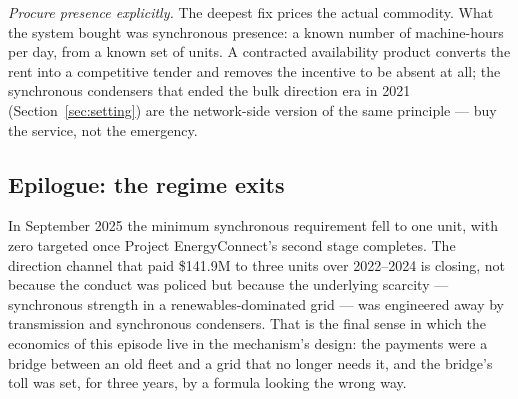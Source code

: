\emph{Procure presence explicitly.} The deepest fix prices the actual
commodity. What the system bought was synchronous presence: a known number of
machine-hours per day, from a known set of units. A contracted availability
product converts the rent into a competitive tender and removes the incentive
to be absent at all; the synchronous condensers that ended the bulk direction
era in 2021 (Section~\ref{sec:setting}) are the network-side version of the
same principle --- buy the service, not the emergency.

\subsection{Epilogue: the regime exits}

In September 2025 the minimum synchronous requirement fell to one unit, with
zero targeted once Project EnergyConnect's second stage completes. The
direction channel that paid \$141.9M to three units over 2022--2024 is
closing, not because the conduct was policed but because the underlying
scarcity --- synchronous strength in a renewables-dominated grid --- was
engineered away by transmission and synchronous condensers. That is the final
sense in which the economics of this episode live in the mechanism's design:
the payments were a bridge between an old fleet and a grid that no longer
needs it, and the bridge's toll was set, for three years, by a formula
looking the wrong way.
